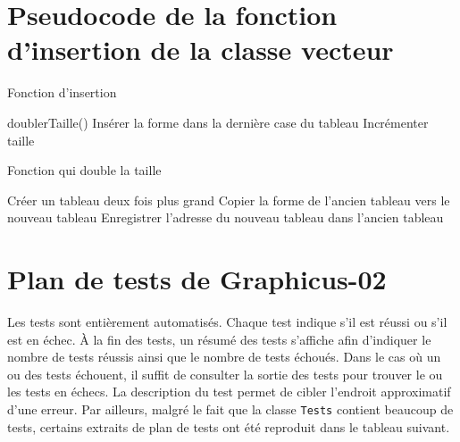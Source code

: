 \section{Pseudocode de la fonction d’insertion de la classe vecteur}

\begin{algorithm}[H]
    \caption{Fonction d'insertion}
    \begin{algorithmic}[1]
            \State doublerTaille()
        \EndIf
        \State Insérer la forme dans la dernière case du tableau
        \State Incrémenter taille
        \EndProcedure
    \end{algorithmic}
\end{algorithm}

\begin{algorithm}[H]
    \caption{Fonction qui double la taille}
    \begin{algorithmic}[1]
        \State Créer un tableau deux fois plus grand
            \State Copier la forme de l'ancien tableau vers le nouveau tableau
        \EndFor
        \State Enregistrer l'adresse du nouveau tableau dans l'ancien tableau
        \EndProcedure
    \end{algorithmic}
\end{algorithm}

\section{Plan de tests de Graphicus-02}

Les tests sont entièrement automatisés.
Chaque test indique s'il est réussi ou s'il est en échec.
À la fin des tests, un résumé des tests s'affiche afin d'indiquer le nombre de tests réussis ainsi que le nombre de tests échoués.
Dans le cas où un ou des tests échouent, il suffit de consulter la sortie des tests pour trouver le ou les tests en échecs.
La description du test permet de cibler l'endroit approximatif d'une erreur.
Par ailleurs, malgré le fait que la classe \texttt{Tests} contient beaucoup de tests, certains extraits de plan de tests ont été reproduit dans le tableau suivant.

